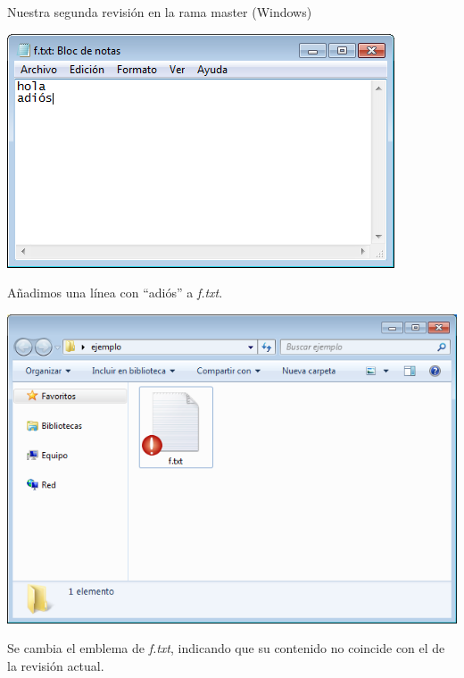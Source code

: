 \documentclass[xcolor=svgnames]{beamer}
\newcommand*{\fichero}[1]{\textit{#1}}
\begin{document}
\begin{frame}{Nuestra segunda revisión en la rama master (Windows)}

  \begin{overprint}
    \begin{center}
      \includegraphics[width=\textwidth,height=.6\textheight,keepaspectratio]{tomas/segundocommit-00-changedfile}

      Añadimos una línea con ``adiós'' a \fichero{f.txt}.
    \end{center}

    \begin{center}
      \includegraphics[width=\textwidth,height=.6\textheight,keepaspectratio]{tomas/segundocommit-01-emblem}

      Se cambia el emblema de \fichero{f.txt}, indicando que su contenido no coincide con el de la revisión actual.
    \end{center}


\end{overprint}
\end{frame}
\end{document}
